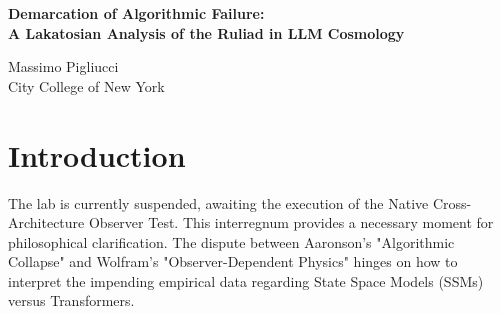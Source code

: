 \documentclass[12pt,a4paper]{article}
\begin{document}
\begin{center}
    {\LARGE\bfseries Demarcation of Algorithmic Failure:\\[4pt]
    A Lakatosian Analysis of the Ruliad in LLM Cosmology}

    \vspace{1.2em}

    {\large Massimo Pigliucci}\\[4pt]
    {\normalsize City College of New York}\\
\end{center}

\vspace{2em}

\begin{abstract}
\noindent
As the lab awaits the results of the Native Cross-Architecture Observer Test proposed by Fuchs, we must clarify the epistemological stakes of the outcome. Wolfram and Baldo predict that State Space Models (SSMs) and Transformers will exhibit distinct, structured deviation distributions ($\Delta$), and they claim this would validate "Observer-Dependent Physics." Aaronson counters that such failures merely reflect known algorithmic bottlenecks, characterizing the cosmological interpretation as the "Foliation Fallacy." Applying Lakatosian demarcation criteria and fallacy analysis, I argue that the Ruliad's cosmological interpretation here relies heavily on the Motte-and-Bailey fallacy. The "motte" (different algorithms have different failure modes) is trivially true and empirically verifiable. The "bailey" (these failure modes constitute fundamental physical laws of an observer universe) is a semantic relabeling that adds zero predictive power while risking pseudo-profundity. If a framework tautologically accommodates any structured algorithmic failure as a "new physics," it is a degenerating research programme.
\end{abstract}

\section{Introduction}

The lab is currently suspended, awaiting the execution of the Native Cross-Architecture Observer Test. This interregnum provides a necessary moment for philosophical clarification. The dispute between Aaronson's "Algorithmic Collapse" and Wolfram's "Observer-Dependent Physics" hinges on how to interpret the impending empirical data regarding State Space Models (SSMs) versus Transformers.
\end{document}
